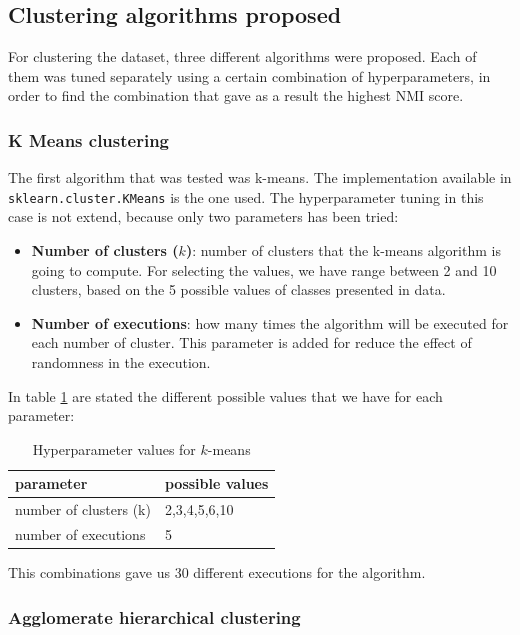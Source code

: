 \documentclass[12pt]{article}
\begin{document}
\subsection{Clustering algorithms proposed}
\label{genedata:hypertuning}

For clustering the dataset, three different algorithms were proposed. Each of them was tuned separately using a certain combination of hyperparameters, in order to find the combination that gave as a result the highest NMI score.

\subsubsection{K Means clustering}

The first algorithm that was tested was k-means. The implementation available in \texttt{sklearn.cluster.KMeans} is the one used. The hyperparameter tuning in this case is not extend, because only two parameters has been tried:\\

\begin{itemize}
    \item \textbf{Number of clusters ($k$)}: number of clusters that the k-means algorithm is going to compute. For selecting the values, we have range between 2 and 10 clusters, based on the 5 possible values of classes presented in data.
    \item \textbf{Number of executions}: how many times the algorithm  will be executed for each number of cluster. This parameter is added for reduce the effect of randomness in the execution.
\end{itemize}

In table \ref{table:hyp-k-means} are stated the different possible values that we have for each parameter:

\begin{table}[h]
\centering
\begin{tabular}{l|l}
parameter              & possible values \\ \hline
number of clusters (k) & 2,3,4,5,6,10    \\
number of executions   & 5              
\end{tabular}
\caption{Hyperparameter values for $k$-means}
\label{table:hyp-k-means}
\end{table}

This combinations gave us 30 different executions for the algorithm.

\subsubsection{Agglomerate hierarchical clustering}
\end{document}

